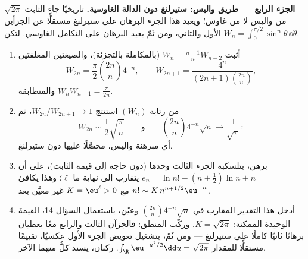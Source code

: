 \begin{problem}
\medskip
\noindent\textbf{الجزء الرابع --- طريق واليس: ستيرلنغ دون
الدالة الغاوسية.} تاريخيًا جاء الثابت $\sqrt{2\pi}$ من واليس لا
من غاوس؛ ويعيد هذا الجزء البرهان على ستيرلنغ مستقلًّا عن
الجزأين الأول والثاني، ومن ثَمّ يعيد البرهان على التكامل
الغاوسي. لتكن $W_n = \int_0^{\pi/2}\sin^n\theta\,
\dd\theta$.
\begin{enumerate}[resume]
  \item أثبت $W_n = \frac{n-1}nW_{n-2}$ (بالمكاملة بالتجزئة)، والصيغتين المغلقتين
        \[
        W_{2n} = \frac\pi2\binom{2n}n4^{-n}, \qquad
        W_{2n+1} = \frac{4^n}{(2n+1)\binom{2n}n},
        \]
        والمتطابقة $W_nW_{n-1} = \frac\pi{2n}$.
  \item من رتابة $(W_n)$ استنتج $W_{2n}/W_{2n+1} \to 1$، ثم
        \[
        W_{2n} \sim \frac12\sqrt{\frac\pi n}
        \qquad\text{و}\qquad
        \binom{2n}n4^{-n}\sqrt n \longrightarrow
        \frac1{\sqrt\pi} :
        \]
        أي مبرهنة واليس، محصَّلًا عليها دون ستيرلنغ.
  \item برهن، بتلسكبة الجزء الثالث وحدها (دون حاجة إلى قيمة
        الثابت)، على أن $e_n = \ln n! - (n +
        \frac12)\ln n + n$ يتقارب إلى نهاية ما $\ell$؛ وهذا
        يكافئ $n! \sim K\,n^{n+1/2}\eu^{-n}$ مع $K =
        \eu^\ell > 0$ غير معيَّن بعد.
  \item أدخل هذا التقدير المقارب في $\binom{2n}n4^{-n}\sqrt n$ وعيّن، باستعمال
        السؤال 14، القيمةَ الوحيدة الممكنة: $K = \sqrt{2\pi}$. وركّب
        المنطق: فالجزآن الثالث والرابع معًا يعطيان برهانًا
        ثانيًا كاملًا على ستيرلنغ --- ومن ثَمّ، بتشغيل تعويض
        الجزء الأول عكسيًا، تقييمًا مستقلًّا للمقدار $\int_\R\eu^{-u^2/2}\dd u = \sqrt{2\pi}$.
        ركنان، يسند كلٌّ منهما الآخر.
\end{enumerate}


\end{problem}
